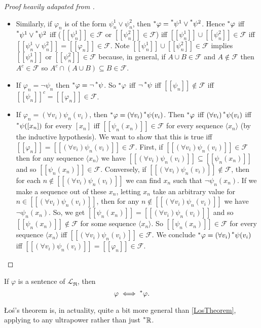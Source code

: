 \begin{proof}[Proof heavily adapated from ]
\begin{itemize}
        \item Similarly, if $\varphi_n$ is of the form $\psi^1_n \lor \psi^2_n$, then $\prescript{*}{}{\varphi} = \prescript{*}{}{\psi^1} \lor \prescript{*}{}{\psi^2}$. Hence $\prescript{*}{}{\varphi}$ iff $\prescript{*}{}{\psi^1} \lor \prescript{*}{}{\psi^2}$ iff ($[[\psi^1_n]] \in \mathcal {F}$ or $[[\psi^2_n]] \in \mathcal{F}$) iff $[[\psi^1_n]] \cup [[\psi^2_n]] \in \mathcal{F}$ iff $[[\psi^1_n \lor \psi^2_n]] = [[\varphi_n]] \in \mathcal{F}$. Note $[[\psi^1_n]] \cup [[\psi^2_n]] \in \mathcal{F}$ implies $[[\psi^1_n]]$ or $[[\psi^2_n]] \in \mathcal{F}$ because, in general, if $A \cup B \in \mathcal{F}$ and $A \notin \mathcal{F}$ then $A^c \in \mathcal{F}$ so $A^c \cap (A \cup B) \subseteq B \in \mathcal{F}$.
        
        \item If $\varphi_n = \neg \psi_n$ then $\prescript{*}{}{\varphi} = \neg \prescript{*}{}{\psi}$. So $\prescript{*}{}{\varphi}$ iff $\neg \prescript{*}{}{\psi}$ iff $[[\psi_n]] \notin \mathcal{F}$ iff $[[\psi_n]]^c = [[\varphi_n]] \in \mathcal{F}$.
        
        \item If $\varphi_n = (\forall v_i)\psi_n(v_i)$, then $\prescript{*}{}{\varphi} = (\forall v_i) \prescript{*}{}{\psi}(v_i)$. Then $\prescript{*}{}{\varphi}$ iff $(\forall v_i)\prescript{*}{}{\psi}(v_i)$ iff $\prescript{*}{}{\psi}([x_n])$ for every $[x_n]$ iff $[[\psi_n(x_n)]] \in \mathcal{F}$ for every sequence $\langle x_n \rangle$ (by the inductive hypothesis). We want to show that this is true iff $[[\varphi_n]] = [[(\forall v_i)\psi_n(v_i)]] \in \mathcal{F}$. First, if $[[(\forall v_i)\psi_n(v_i)]] \in \mathcal{F}$ then for any sequence $\langle x_n \rangle$ we have $[[(\forall v_i)\psi_n(v_i)]] \subseteq [[\psi_n(x_n)]]$ and so $[[\psi_n(x_n)]] \in \mathcal{F}$. Conversely, if $[[(\forall v_i)\psi_n(v_i)]] \notin \mathcal{F}$, then for each $n \notin [[(\forall v_i)\psi_n(v_i)]]$ we can find $x_n$ such that $\neg \psi_n(x_n)$. If we make a sequence out of these $x_n$, letting $x_n$ take an arbitrary value for $n \in [[(\forall v_i)\psi_n(v_i)]]$, then for any $n \notin [[(\forall v_i)\psi_n(v_i)]]$ we have $\neg \psi_n(x_n)$. So, we get $[[\psi_n(x_n)]] = [[(\forall v_i)\psi_n(v_i)]]$ and so $[[\psi_n(x_n)]] \notin \mathcal{F}$ for some sequence $\langle x_n \rangle$. So $[[\psi_n(x_n)]] \in \mathcal{F}$ for every sequence $\langle x_n \rangle$ iff $[[(\forall v_i)\psi_n(v_i)]] \in \mathcal{F}$. We conclude $\prescript{*}{}{\varphi} = (\forall v_i)\prescript{*}{}{\psi}(v_i)$ iff $[[(\forall v_i)\psi_n(v_i)]] = [[\varphi_n]] \in \mathcal{F}$.
    \end{itemize}
\end{proof}

\begin{corollary}\label{transferPrinciple}
    If $\varphi$ is a sentence of $\mathcal{L}_\mathfrak{R}$, then
    \[ \varphi \iff \prescript{*}{}{\varphi}. \]
\end{corollary}

\L o\'s's theorem is, in actuality, quite a bit more general than \autoref{LosTheorem}, applying to any ultrapower rather than just $\prescript{*}{}{\mathbb{R}}$. 
